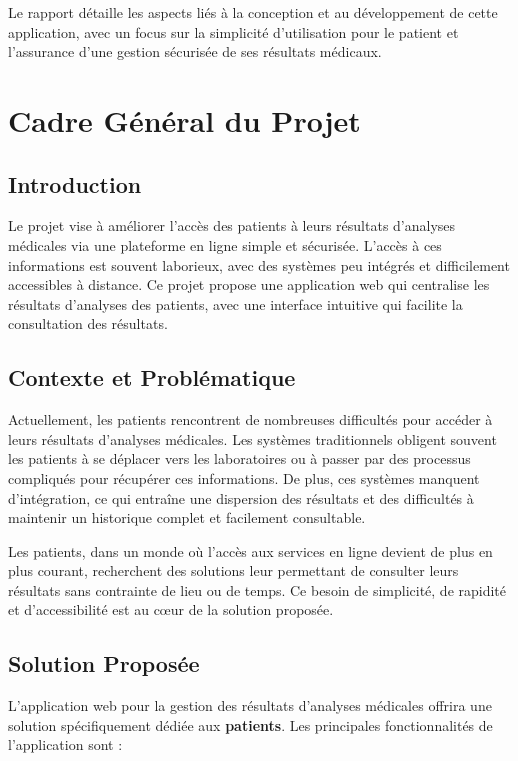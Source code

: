 \documentclass[12pt,a4paper]{report}
\begin{document}
Le rapport détaille les aspects liés à la conception et au développement de cette application, avec un focus sur la simplicité d'utilisation pour le patient et l'assurance d'une gestion sécurisée de ses résultats médicaux.

\chapter{Cadre Général du Projet}

\section{Introduction}
Le projet vise à améliorer l'accès des patients à leurs résultats d'analyses médicales via une plateforme en ligne simple et sécurisée. L'accès à ces informations est souvent laborieux, avec des systèmes peu intégrés et difficilement accessibles à distance. Ce projet propose une application web qui centralise les résultats d'analyses des patients, avec une interface intuitive qui facilite la consultation des résultats.

\section{Contexte et Problématique}
Actuellement, les patients rencontrent de nombreuses difficultés pour accéder à leurs résultats d'analyses médicales. Les systèmes traditionnels obligent souvent les patients à se déplacer vers les laboratoires ou à passer par des processus compliqués pour récupérer ces informations. De plus, ces systèmes manquent d'intégration, ce qui entraîne une dispersion des résultats et des difficultés à maintenir un historique complet et facilement consultable.

Les patients, dans un monde où l'accès aux services en ligne devient de plus en plus courant, recherchent des solutions leur permettant de consulter leurs résultats sans contrainte de lieu ou de temps. Ce besoin de simplicité, de rapidité et d'accessibilité est au cœur de la solution proposée.

\section{Solution Proposée}
L'application web pour la gestion des résultats d'analyses médicales offrira une solution spécifiquement dédiée aux \textbf{patients}. Les principales fonctionnalités de l'application sont :
\end{document}
